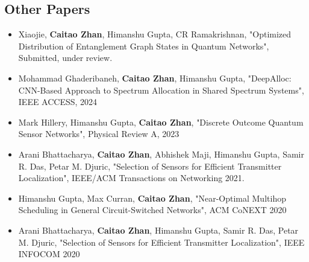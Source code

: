 \subsection*{Other Papers}
\begin{itemize}

    \item Xiaojie, \textbf{Caitao Zhan}, Himanshu Gupta, CR Ramakrishnan, "Optimized Distribution of Entanglement Graph States in Quantum Networks", Submitted, under review.

    \item Mohammad Ghaderibaneh, \textbf{Caitao Zhan}, Himanshu Gupta, "DeepAlloc: CNN-Based Approach to Spectrum Allocation in Shared Spectrum Systems", IEEE ACCESS, 2024

    \item Mark Hillery, Himanshu Gupta, \textbf{Caitao Zhan}, "Discrete Outcome Quantum Sensor Networks", Physical Review A, 2023

    \item Arani Bhattacharya, \textbf{Caitao Zhan}, Abhishek Maji, Himanshu Gupta, Samir R. Das, Petar M. Djuric, "Selection of Sensors for Efficient Transmitter Localization", IEEE/ACM Transactions on Networking 2021.

    \item Himanshu Gupta, Max Curran, \textbf{Caitao Zhan}, "Near-Optimal Multihop Scheduling in General Circuit-Switched Networks", ACM CoNEXT 2020
    
    \item Arani Bhattacharya, \textbf{Caitao Zhan}, Himanshu Gupta, Samir R. Das, Petar M. Djuric, "Selection of Sensors for Efficient Transmitter Localization", IEEE INFOCOM 2020
  
\end{itemize}

